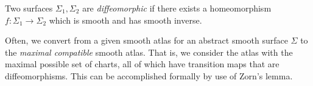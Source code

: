 \begin{definition}
	Two surfaces $\Sigma_1, \Sigma_2$ are \textit{diffeomorphic} if there exists a homeomorphism $f \colon \Sigma_1 \to \Sigma_2$ which is smooth and has smooth inverse.
\end{definition}
\begin{remark}
	Often, we convert from a given smooth atlas for an abstract smooth surface $\Sigma$ to the \textit{maximal compatible} smooth atlas.
	That is, we consider the atlas with the maximal possible set of charts, all of which have transition maps that are diffeomorphisms.
	This can be accomplished formally by use of Zorn's lemma.
\end{remark}
